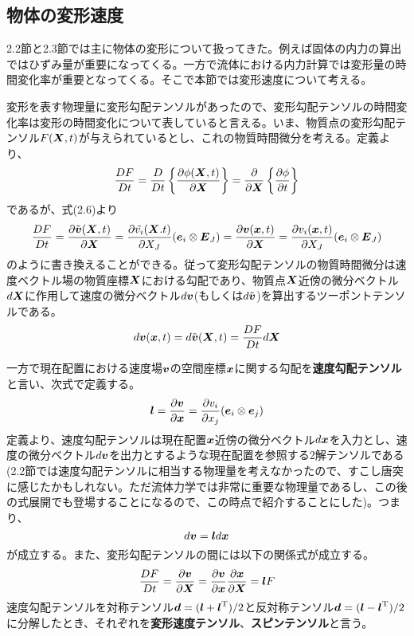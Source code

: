 \documentclass[dvipdfmx, 9pt, a4paper]{jsarticle}
\numberwithin{equation}{section}
\newcommand{\bm}[1]{{\mbox{\boldmath $#1$}}}
\begin{document}
\subsection{物体の変形速度}
2.2節と2.3節では主に物体の変形について扱ってきた。例えば固体の内力の算出ではひずみ量が重要になってくる。一方で流体における内力計算では変形量の時間変化率が重要となってくる。そこで本節では変形速度について考える。\par
変形を表す物理量に変形勾配テンソルがあったので、変形勾配テンソルの時間変化率は変形の時間変化について表していると言える。いま、物質点の変形勾配テンソル$F(\bm X, t)$が与えられているとし、これの物質時間微分を考える。定義より、
\begin{equation}
\frac{DF}{Dt}=\frac{D}{Dt}\left\{ \frac{\partial \phi(\bm X, t)}{\partial \bm X} \right\}=\frac{\partial }{\partial \bm X}\left\{ \frac{\partial \phi}{\partial t} \right\} \notag
\end{equation}
であるが、式(2.6)より
\begin{equation}
\frac{DF}{Dt}=\frac{\partial \tilde{\bm v}(\bm X, t)}{\partial \bm X}=\frac{\partial \tilde{v_i}(\bm X. t)}{\partial X_J}(\bm e_i \otimes \bm E_J)=\frac{\partial \bm v(\bm x, t)}{\partial \bm X}=\frac{\partial v_i(\bm x, t)}{\partial X_J}(\bm e_i \otimes \bm E_J)
\end{equation}
のように書き換えることができる。従って変形勾配テンソルの物質時間微分は速度ベクトル場の物質座標$\bm X$における勾配であり、物質点$\bm X$近傍の微分ベクトル$d\bm X$に作用して速度の微分ベクトル$d\bm v$(もしくは$d\tilde{\bm v}$)を算出するツーポントテンソルである。
\begin{equation}
d\bm v(\bm x, t)=d\tilde{\bm v}(\bm X, t)=\frac{DF}{Dt}d\bm X
\end{equation}\par
一方で現在配置における速度場$\bm v$の空間座標$\bm x$に関する勾配を{\bf 速度勾配テンソル}と言い、次式で定義する。
\begin{equation}
\bm l=\frac{\partial \bm v}{\partial \bm x}=\frac{\partial v_i}{\partial x_j}(\bm e_i \otimes \bm e_j)
\end{equation}
定義より、速度勾配テンソルは現在配置$\bm x$近傍の微分ベクトル$d\bm x$を入力とし、速度の微分ベクトル$d\bm v$を出力とするような現在配置を参照する2解テンソルである(2.2節では速度勾配テンソルに相当する物理量を考えなかったので、すこし唐突に感じたかもしれない。ただ流体力学では非常に重要な物理量であるし、この後の式展開でも登場することになるので、この時点で紹介することにした)。つまり、
\begin{equation}
d\bm v=\bm ld\bm x
\end{equation}
が成立する。また、変形勾配テンソルの間には以下の関係式が成立する。
\begin{equation}
\frac{DF}{Dt}=\frac{\partial \bm v}{\partial \bm X}=\frac{\partial \bm v}{\partial \bm x}\frac{\partial \bm x}{\partial \bm X}=\bm lF
\end{equation}
速度勾配テンソルを対称テンソル$\bm d=(\bm l+\bm l^{\rm T})/2$と反対称テンソル$\bm d=(\bm l-\bm l^{\rm T})/2$に分解したとき、それぞれを{\bf 変形速度テンソル}、{\bf スピンテンソル}と言う。
\end{document}

